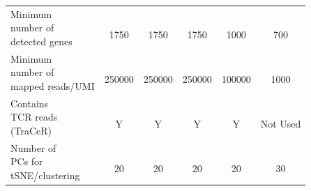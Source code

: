 \begin{table}[htp!]
\begin{tabular}{l|c c c c c}
\specialcell[t]{Minimum\\number of\\detected genes} & \specialcell[t]{ \\1750\\ } & \specialcell[t]{ \\1750\\ } & \specialcell[t]{ \\1750\\ } & \specialcell[t]{ \\1000\\ } & \specialcell[t]{ \\700\\ }\\

\specialcell[t]{Minimum\\number of\\mapped reads/UMI} & \specialcell[t]{ \\250000\\ } & \specialcell[t]{ \\250000\\ } & \specialcell[t]{ \\250000\\ } & \specialcell[t]{ \\100000\\ } & \specialcell[t]{ \\1000\\ }\\

\specialcell[t]{Contains\\TCR reads\\(TraCeR)} & \specialcell[t]{ \\Y\\ } & \specialcell[t]{ \\Y\\ } & \specialcell[t]{ \\Y\\ } & \specialcell[t]{ \\Y\\ } & \specialcell[t]{ \\Not Used\\ }\\

\specialcell[t]{Number of\\PCs for\\tSNE/clustering} & \specialcell[t]{ \\20\\ } & \specialcell[t]{ \\20\\ } & \specialcell[t]{ \\20\\ } & \specialcell[t]{ \\20\\ } & \specialcell[t]{ \\30\\ }\\


\end{tabular}
\end{table}
